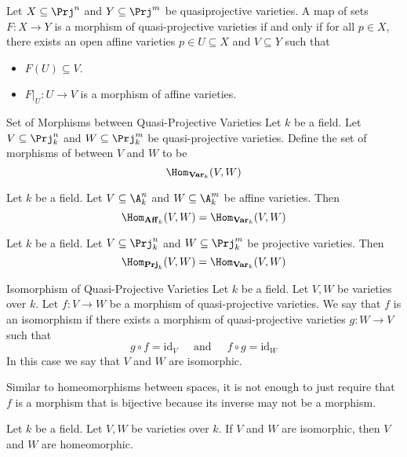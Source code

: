 \documentclass[a4paper]{article}
\begin{document}
\begin{prp}{}{} Let $X\subseteq\Prj^n$ and $Y\subseteq\Prj^m$ be quasiprojective varieties. A map of sets $F:X\to Y$ is a morphism of quasi-projective varieties if and only if for all $p\in X$, there exists an open affine varieties $p\in U\subseteq X$ and $V\subseteq Y$ such that 
\begin{itemize}
\item $F(U)\subseteq V$. 
\item $F|_U:U\to V$ is a morphism of affine varieties. 
\end{itemize}
\end{prp}

\begin{defn}{Set of Morphisms between Quasi-Projective Varieties}{} Let $k$ be a field. Let $V\subseteq\Prj_k^n$ and $W\subseteq\Prj_k^m$ be quasi-projective varieties. Define the set of morphisms of between $V$ and $W$ to be $$\Hom_{\bold{Var}_k}(V,W)$$
\end{defn}

\begin{lmm}{}{} Let $k$ be a field. Let $V\subseteq\A_k^n$ and $W\subseteq\A_k^m$ be affine varieties. Then $$\Hom_{\bold{Aff}_k}(V,W)=\Hom_{\bold{Var}_k}(V,W)$$
\end{lmm}

\begin{lmm}{}{} Let $k$ be a field. Let $V\subseteq\Prj_k^n$ and $W\subseteq\Prj_k^m$ be projective varieties. Then $$\Hom_{\bold{Prj}_k}(V,W)=\Hom_{\bold{Var}_k}(V,W)$$
\end{lmm}

\begin{defn}{Isomorphism of Quasi-Projective Varieties}{} Let $k$ be a field. Let $V,W$ be varieties over $k$. Let $f:V\to W$ be a morphism of quasi-projective varieties. We say that $f$ is an isomorphism if there exists a morphism of quasi-projective varieties $g:W\to V$ such that $$g\circ f=\text{id}_V\;\;\;\;\text{ and }\;\;\;\;f\circ g=\text{id}_W$$ In this case we say that $V$ and $W$ are isomorphic. 
\end{defn}

Similar to homeomorphisms between spaces, it is not enough to just require that $f$ is a morphism that is bijective because its inverse may not be a morphism. 

\begin{prp}{}{} Let $k$ be a field. Let $V,W$ be varieties over $k$. If $V$ and $W$ are isomorphic, then $V$ and $W$ are homeomorphic. 
\end{prp}
\end{document}
